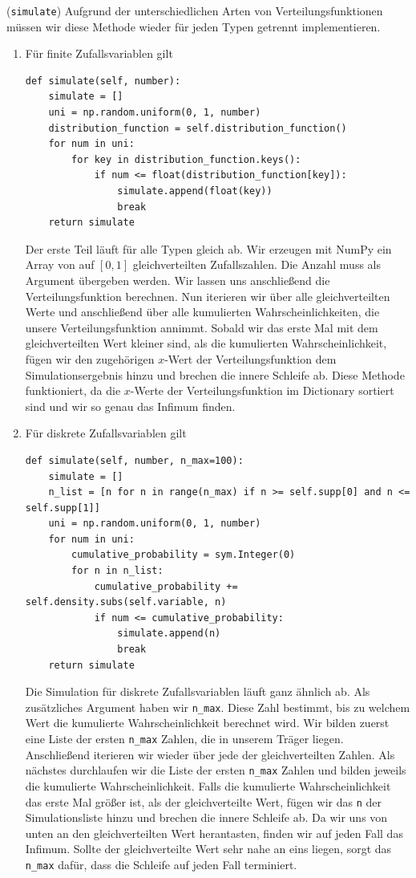 \begin{Code}{(\lstinline|simulate|)}
Aufgrund der unterschiedlichen Arten von Verteilungsfunktionen müssen wir diese Methode wieder für jeden Typen getrennt implementieren.
\begin{enumerate}[label=(\roman*)]
\item Für finite Zufallsvariablen gilt
\begin{lstlisting}
def simulate(self, number):
    simulate = []
    uni = np.random.uniform(0, 1, number)
    distribution_function = self.distribution_function()
    for num in uni:
        for key in distribution_function.keys():
            if num <= float(distribution_function[key]):
                simulate.append(float(key))
                break
    return simulate
\end{lstlisting}
Der erste Teil läuft für alle Typen gleich ab. Wir erzeugen mit NumPy ein Array von auf $[0, 1]$ gleichverteilten Zufallszahlen. Die Anzahl muss als Argument übergeben werden. Wir lassen uns anschließend die Verteilungsfunktion berechnen. Nun iterieren wir über alle gleichverteilten Werte und anschließend über alle kumulierten Wahrscheinlichkeiten, die unsere Verteilungsfunktion annimmt. Sobald wir das erste Mal mit dem gleichverteilten Wert kleiner sind, als die kumulierten Wahrscheinlichkeit, fügen wir den zugehörigen $x$-Wert der Verteilungsfunktion dem Simulationsergebnis hinzu und brechen die innere Schleife ab. Diese Methode funktioniert, da die $x$-Werte der Verteilungsfunktion im Dictionary sortiert sind und  wir so genau das Infimum finden.

\item Für diskrete Zufallsvariablen gilt
\begin{lstlisting}
def simulate(self, number, n_max=100):
    simulate = []
    n_list = [n for n in range(n_max) if n >= self.supp[0] and n <= self.supp[1]]
    uni = np.random.uniform(0, 1, number)
    for num in uni:
        cumulative_probability = sym.Integer(0)
        for n in n_list:
            cumulative_probability += self.density.subs(self.variable, n)
            if num <= cumulative_probability:
                simulate.append(n)
                break
    return simulate
\end{lstlisting}
Die Simulation für diskrete Zufallsvariablen läuft ganz ähnlich ab. Als zusätzliches Argument haben wir \lstinline|n_max|. Diese Zahl bestimmt, bis zu welchem Wert die kumulierte Wahrscheinlichkeit berechnet wird. Wir bilden zuerst eine Liste der ersten \lstinline|n_max| Zahlen, die in unserem Träger liegen. Anschließend iterieren wir wieder über jede der gleichverteilten Zahlen. Als nächstes durchlaufen wir die Liste der ersten \lstinline|n_max| Zahlen und bilden jeweils die kumulierte Wahrscheinlichkeit. Falls die kumulierte Wahrscheinlichkeit das erste Mal größer ist, als der gleichverteilte Wert, fügen wir das \lstinline|n| der Simulationsliste hinzu und brechen die innere Schleife ab. Da wir uns von unten an den gleichverteilten Wert herantasten, finden wir auf jeden Fall das Infimum. Sollte der gleichverteilte Wert sehr nahe an eins liegen, sorgt das \lstinline|n_max| dafür, dass die Schleife auf jeden Fall terminiert.


\end{enumerate}
\end{Code}
